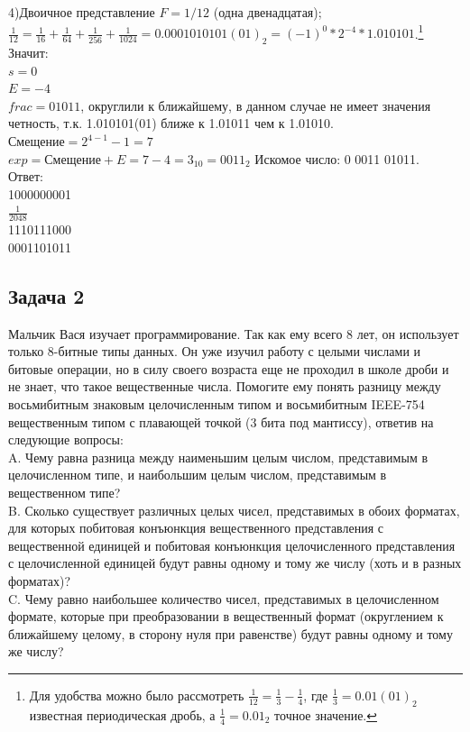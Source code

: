 \documentclass[12pt, letterpaper]{article}
\begin{document}
4)Двоичное представление $F=1/12$ (одна двенадцатая);\\
$\frac{1}{12} = \frac{1}{16} + \frac{1}{64} + \frac{1}{256} + \frac{1}{1024} = 0.0001010101(01)_2 = (-1)^0 * 2^{-4} * 1.010101$.\footnote{Для удобства можно было рассмотреть $\frac{1}{12} = \frac{1}{3} - \frac{1}{4}$, где $\frac{1}{3} = 0.01(01)_2$ известная периодическая дробь, а $\frac{1}{4} = 0.01_2$ точное значение.} Значит:\\
$s = 0$\\
$E = -4$\\
$frac = 01011$, округлили к ближайшему, в данном случае не имеет значения четность, т.к. 1.010101(01) ближе к 1.01011 чем к 1.01010.\\
$\text{Смещение} = 2^{4-1} - 1 = 7$\\
$exp = \text{Смещение} + E = 7 - 4 = 3_{10} = 0011_2$
Искомое число: 0 0011 01011.\\

Ответ:\\
1000000001\\
$\frac{1}{2048}$\\
1110111000\\
0001101011
\newpage
\subsection{Задача 2}
Мальчик Вася изучает программирование. Так как ему всего 8 лет, он использует только 8-битные типы данных. Он уже изучил работу с целыми числами и битовые операции, но в силу своего возраста еще не проходил в школе дроби и не знает, что такое вещественные числа. Помогите ему понять разницу между восьмибитным знаковым целочисленным типом и восьмибитным IEEE-754 вещественным типом с плавающей точкой (3 бита под мантиссу), ответив на следующие вопросы:\\

A. Чему равна разница между наименьшим целым числом, представимым в целочисленном типе, и наибольшим целым числом, представимым в вещественном типе?\\

B. Сколько существует различных целых чисел, представимых в обоих форматах, для которых побитовая конъюнкция вещественного представления с вещественной единицей и побитовая конъюнкция целочисленного представления с целочисленной единицей будут равны одному и тому же числу (хоть и в разных форматах)?\\

C. Чему равно наибольшее количество чисел, представимых в целочисленном формате, которые при преобразовании в вещественный формат (округлением к ближайшему целому, в сторону нуля при равенстве) будут равны одному и тому же числу?\\
\end{document}
